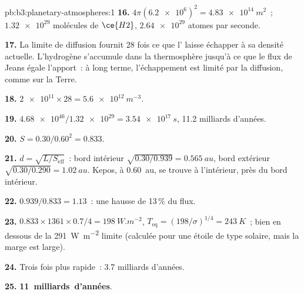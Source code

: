 \begin{solution}{pb:b3:planetary-atmospheres:1}
\textbf{16.} $4\pi(\num{6.2e6})^2 = \qty{4.83e14}{m^2}$~; $\num{1.32e29}$ molécules
de $\ce{H2}$, $\num{2.64e29}$ atomes par seconde.

\textbf{17.} La limite de diffusion fournit 28 fois ce que l' laisse échapper à
sa densité actuelle. L'hydrogène s'accumule dans la thermosphère jusqu'à ce que le
flux de Jeans égale l'apport~: à long terme, l'échappement est
limité par la diffusion, comme sur la Terre.

\textbf{18.} $\num{2e11}\times28 = \qty{5.6e12}{m^{-3}}$.

\textbf{19.} $\num{4.68e46}/\num{1.32e29} = \qty{3.54e17}{s}$, 11.2 milliards d'années.

\textbf{20.} $S = 0.30/0.60^2 = 0.833$.

\textbf{21.} $d = \sqrt{L/S_\mathrm{eff}}$~: bord intérieur $\sqrt{0.30/0.939} =
\qty{0.565}{au}$, bord extérieur $\sqrt{0.30/0.290} = \qty{1.02}{au}$. Kepos,
à \qty{0.60}{au}, se trouve à l'intérieur, près du bord intérieur.

\textbf{22.} $0.939/0.833 = 1.13$~: une hausse de 13\,\% du flux.

\textbf{23.} $0.833\times1361\times0.7/4 = \qty{198}{W.m^{-2}}$, $T_\mathrm{eq} =
(198/\sigma)^{1/4} = \qty{243}{K}$~; bien en dessous de la
\qty{291}{W.m^{-2}} limite (calculée pour une étoile de type solaire, mais la marge
est large).

\textbf{24.} Trois fois plus rapide~: 3.7 milliards d'années.

\textbf{25.} \textbf{11~milliards~d'années}.
\end{solution}
